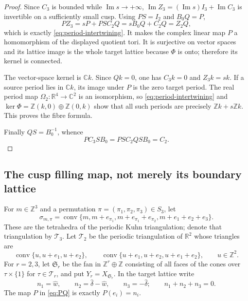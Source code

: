 \documentclass[11pt]{article}
\theoremstyle{definition}
\newcommand{\C}{\mathbb C}
\newcommand{\R}{\mathbb R}
\newcommand{\Z}{\mathbb Z}
\begin{document}
\begin{proof}
Since $C_3$ is bounded while $\operatorname{Im}s\to+\infty$,
$\operatorname{Im}Z_3=(\operatorname{Im}s)I_3+\operatorname{Im}C_3$ is
invertible on a sufficiently small cusp.  Using $PS=I_2$ and $B_0Q=P$,
\[
 PZ_3=sP+PSC_2Q=sB_0Q+C_2Q=Z_2Q,
\]
which is exactly \eqref{eq:period-intertwining}.  It makes the complex
linear map $P$ a homomorphism of the displayed quotient tori.  It is
surjective on vector spaces and its lattice image is the whole target
lattice because $\Phi$ is onto; therefore its kernel is connected.

The vector-space kernel is $\C k$.  Since $Qk=0$, one has $C_3k=0$ and
$Z_3k=sk$.  If a source period lies in $\C k$, its image under $P$ is the
zero target period.  The real period map $\Omega_2:\R^4\to\C^2$ is an
isomorphism, so \eqref{eq:period-intertwining} and
$\ker\Phi=\Z(k,0)\oplus\Z(0,k)$ show that all such periods are precisely
$\Z k+s\Z k$.  This proves the fibre formula.

Finally $QS=B_0^{-1}$, whence
\[
 PC_3SB_0=PSC_2QSB_0=C_2.
\]
\end{proof}

\subsection{The cusp filling map, not merely its boundary lattice}

For $m\in\Z^3$ and a permutation
$\pi=(\pi_1,\pi_2,\pi_3)\in S_3$, let
\begin{equation}
 \sigma_{m,\pi}=\operatorname{conv}
 \{m,m+e_{\pi_1},m+e_{\pi_1}+e_{\pi_2},m+e_1+e_2+e_3\}.
 \label{eq:kuhn-tetrahedron}
\end{equation}
These are the tetrahedra of the periodic Kuhn triangulation; denote that
triangulation by $\mathcal T_3$.  Let $\mathcal T_2$ be the periodic
triangulation of $\R^2$ whose triangles are
\[
 \operatorname{conv}\{u,u+e_1,u+e_2\},\qquad
 \operatorname{conv}\{u+e_1,u+e_2,u+e_1+e_2\},
 \qquad u\in\Z^2.
\]
For $r=2,3$, let $\mathfrak S_r$ be the fan in $\Z^r\oplus\Z$ consisting
of all faces of the cones over $\tau\times\{1\}$ for
$\tau\in\mathcal T_r$, and put $Y_r=X_{\mathfrak S_r}$.  In the target
lattice write
\[
 n_1=\widehat w,\qquad n_2=\widehat\delta-\widehat w,\qquad
 n_3=-\widehat\delta;\qquad n_1+n_2+n_3=0.
\]
The map $P$ in \eqref{eq:PQ} is exactly $P(e_i)=n_i$.
\end{document}

